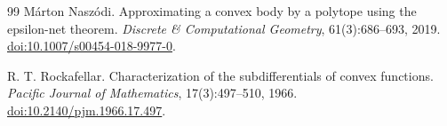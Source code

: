 \documentclass[11pt]{article}
\numberwithin{equation}{section}
\theoremstyle{definition}
\theoremstyle{remark}
\begin{document}
\begin{thebibliography}{99}
M\'arton Nasz\'odi.
\newblock Approximating a convex body by a polytope using the epsilon-net theorem.
\newblock \emph{Discrete \& Computational Geometry}, 61(3):686--693, 2019.
\newblock \href{https://doi.org/10.1007/s00454-018-9977-0}{doi:10.1007/s00454-018-9977-0}.

R. T. Rockafellar.
\newblock Characterization of the subdifferentials of convex functions.
\newblock \emph{Pacific Journal of Mathematics}, 17(3):497--510, 1966.
\newblock \href{https://doi.org/10.2140/pjm.1966.17.497}{doi:10.2140/pjm.1966.17.497}.

\end{thebibliography}
\end{document}
